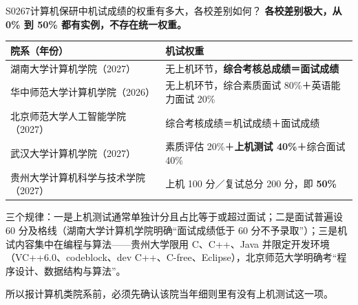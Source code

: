 \begin{qa}{S0267}{计算机保研中机试成绩的权重有多大，各校差别如何？}
\textbf{各校差别极大，从 0\% 到 50\% 都有实例，不存在统一权重。}

\par\vspace{2pt}\nobreak\begin{center}\footnotesize
\begin{tabularx}{\textwidth}{>{\raggedright\arraybackslash}X>{\raggedright\arraybackslash}X}
\toprule
\textbf{院系（年份）} & \textbf{机试权重} \\ \midrule
湖南大学计算机学院（2027） & 无上机环节，\textbf{综合考核总成绩＝面试成绩} \\
华中师范大学计算机学院（2026） & 无上机环节，综合素质面试 80\%＋英语能力面试 20\% \\
北京师范大学人工智能学院（2027） & 综合考核成绩＝机试成绩＋面试成绩 \\
武汉大学计算机学院（2027） & 素质评估 20\%＋\textbf{上机测试 40\%}＋综合面试 40\% \\
贵州大学计算机科学与技术学院（2027） & 上机 100 分／复试总分 200 分，即 \textbf{50\%} \\
\bottomrule
\end{tabularx}
\end{center}\vspace{2pt}\par

三个规律：一是上机测试通常单独计分且占比等于或超过面试；二是面试普遍设 60 分及格线（湖南大学计算机学院明确“面试成绩低于 60 分不予录取”）；三是机试内容集中在编程与算法——贵州大学限用 C、C++、Java 并限定开发环境（VC++6.0、codeblock、dev C++、C-free、Eclipse），北京师范大学明确考“程序设计、数据结构与算法”。

所以报计算机类院系前，必须先确认该院当年细则里有没有上机测试这一项。
\end{qa}

